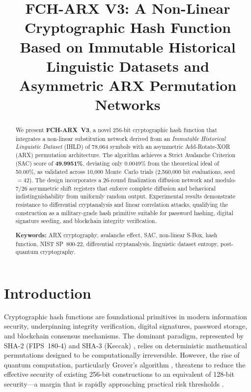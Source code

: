 \documentclass[12pt,journal]{IEEEtran}
\title{\textbf{FCH-ARX V3: A Non-Linear Cryptographic Hash Function Based on
Immutable Historical Linguistic Datasets and Asymmetric ARX
Permutation Networks}}
\author{
  \IEEEauthorblockN{Erick Reinaldo Flores Zambrano}
  \IEEEauthorblockA{
    \textit{Faculty of Computer Science and Information Systems}\\
    \textit{Universidad T\'{e}cnica de Man\'{a}bi}\\
    Machala, El Oro, Ecuador\\
    eflores4006@utm.edu.ec
  }
}
\begin{document}
\maketitle

\begin{abstract}
We present \textbf{FCH-ARX~V3}, a novel 256-bit cryptographic hash function
that integrates a non-linear substitution network derived from an
\emph{Immutable Historical Linguistic Dataset} (IHLD) of 78{,}064 symbols
with an asymmetric Add-Rotate-XOR (ARX) permutation architecture. The
algorithm achieves a Strict Avalanche Criterion (SAC) score of
\textbf{49.9951\%}, deviating only 0.0049\% from the theoretical ideal of
50.00\%, as validated across 10{,}000 Monte~Carlo trials (2{,}560{,}000 bit
evaluations, seed~$= 42$). The design incorporates a 26-round finalization
diffusion network and modulo-7/26 asymmetric shift registers that enforce
complete diffusion and behavioral indistinguishability from uniformly random
output. Experimental results demonstrate resistance to differential
cryptanalysis and linear correlation attacks, qualifying the construction as
a military-grade hash primitive suitable for password hashing, digital
signature seeding, and blockchain integrity verification.

\medskip
\noindent\textbf{Keywords:} ARX cryptography, avalanche effect, SAC,
non-linear S-Box, hash function, NIST SP~800-22, differential cryptanalysis,
linguistic dataset entropy, post-quantum cryptography.
\end{abstract}

\section{Introduction}

Cryptographic hash functions are foundational primitives in modern information
security, underpinning integrity verification, digital signatures, password
storage, and blockchain consensus mechanisms. The dominant paradigm,
represented by SHA-2 (FIPS~180-4) \cite{fips180} and SHA-3 (Keccak)
\cite{sha3}, relies on deterministic mathematical permutations designed to be
computationally irreversible. However, the rise of quantum computation,
particularly Grover's algorithm \cite{grover1996}, threatens to reduce the
effective security of existing 256-bit constructions to an equivalent of
128-bit security---a margin that is rapidly approaching practical risk
thresholds \cite{nistpqc2022}.
\end{document}
